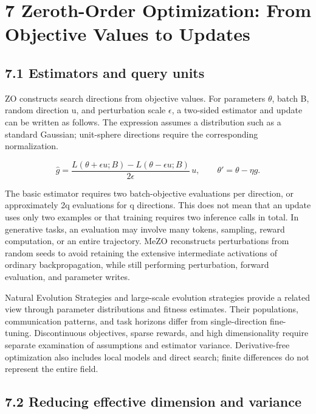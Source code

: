 \section*{7 Zeroth-Order Optimization: From Objective Values to Updates}

\subsection*{7.1 Estimators and query units}

ZO constructs search directions from objective values. For parameters \ensuremath{\theta}, batch B, random direction u, and perturbation scale \ensuremath{\epsilon}, a two-sided estimator and update can be written as follows. The expression assumes a distribution such as a standard Gaussian; unit-sphere directions require the corresponding normalization.\cite{r51,r55,r56}


\[\widehat g=\frac{L(\theta+\epsilon u;B)-L(\theta-\epsilon u;B)}{2\epsilon}\,u,\qquad \theta'=\theta-\eta\widehat g.\]

The basic estimator requires two batch-objective evaluations per direction, or approximately 2q evaluations for q directions. This does not mean that an update uses only two examples or that training requires two inference calls in total. In generative tasks, an evaluation may involve many tokens, sampling, reward computation, or an entire trajectory. MeZO reconstructs perturbations from random seeds to avoid retaining the extensive intermediate activations of ordinary backpropagation, while still performing perturbation, forward evaluation, and parameter writes.\cite{r52}


Natural Evolution Strategies and large-scale evolution strategies provide a related view through parameter distributions and fitness estimates.\cite{r53,r54} Their populations, communication patterns, and task horizons differ from single-direction fine-tuning. Discontinuous objectives, sparse rewards, and high dimensionality require separate examination of assumptions and estimator variance. Derivative-free optimization also includes local models and direct search; finite differences do not represent the entire field.\cite{r55,r56}


\subsection*{7.2 Reducing effective dimension and variance}

\begingroup\small\setlength{\tabcolsep}{5pt}\renewcommand{\arraystretch}{1.18}

